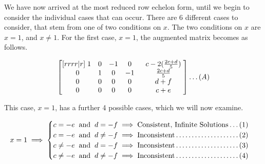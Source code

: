 \documentclass[a4paper]{article}
\begin{document}
\begin{enumerate}[label=\textbf{\arabic*.}]
\begin{enumerate}
				We have now arrived at the most reduced row echelon form, until we begin to consider the individual cases that can occur. There are 6 different cases to consider, that stem from one of two conditions on $x$. The two conditions on $x$ are $x = 1$, and $x \neq 1$.
				\bigbreak
				For the first case, $x = 1$, the augmented matrix becomes as follows.

				$$
				\begin{bmatrix}[rrrr|r]
					\hspace{1mm} 1 & 0 & -1 & 0 \hspace{1mm} & \hspace{1mm} c - 2(\frac{2c + d}{5}) \hspace{1mm}\\
					\hspace{1mm} 0 & 1 & 0 & -1 \hspace{1mm} & \hspace{1mm} \frac{2c + d}{5} \hspace{1mm}\\
					\hspace{1mm} 0 & 0 & 0 & 0 \hspace{1mm} & \hspace{1mm} d + f \hspace{1mm}\\
					\hspace{1mm} 0 & 0 & 0 & 0 \hspace{1mm} & \hspace{1mm} c + e \hspace{1mm}\\
				\end{bmatrix}
				\dots(A)
				$$

				This case, $x = 1$, has a further 4 possible cases, which we will now examine.

				$$
				x = 1 \implies
				\begin{cases}
				c = -e \hspace{2mm}\text{and}\hspace{2mm} d = -f \implies \text{Consistent, Infinite Solutions} \dots \dotfill (1)\\
				c = -e \hspace{2mm}\text{and}\hspace{2mm} d \neq -f \implies \text{Inconsistent} \dotfill (2)\\
				c \neq -e \hspace{2mm}\text{and}\hspace{2mm} d = -f \implies \text{Inconsistent} \dotfill (3)\\
				c \neq -e \hspace{2mm}\text{and}\hspace{2mm} d \neq -f \implies \text{Inconsistent} \dotfill (4)\\
				\end{cases}
				$$


\end{enumerate}
\end{enumerate}
\end{document}
